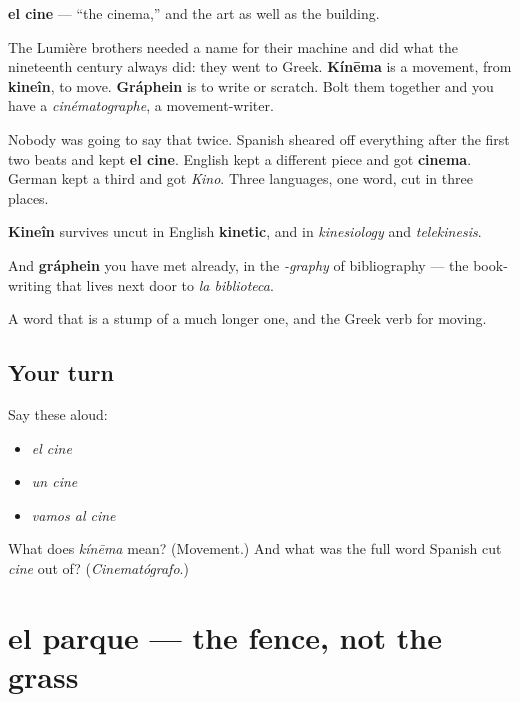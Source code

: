 \begin{cousinweb}
\textbf{el cine} — \textquotedblleft{}the cinema,\textquotedblright{} and the art as well as the building.

The Lumière brothers needed a name for their machine and did what the nineteenth century always did: they went to Greek. \textbf{Kínēma} is a movement, from \textbf{kineîn}, to move. \textbf{Gráphein} is to write or scratch. Bolt them together and you have a \emph{cinématographe}, a movement-writer.

Nobody was going to say that twice. Spanish sheared off everything after the first two beats and kept \textbf{el cine}. English kept a different piece and got \textbf{cinema}. German kept a third and got \emph{Kino}. Three languages, one word, cut in three places.

\textbf{Kineîn} survives uncut in English \textbf{kinetic}, and in \emph{kinesiology} and \emph{telekinesis}.

And \textbf{gráphein} you have met already, in the \emph{-graphy} of bibliography — the book-writing that lives next door to \emph{la biblioteca}.
\end{cousinweb}

\begin{grammarlens}[title={What you've built}]
A word that is a stump of a much longer one, and the Greek verb for moving.
\end{grammarlens}

\subsection*{Your turn}
Say these aloud:

\begin{itemize}
\raggedright
  \item \emph{el cine}
  \item \emph{un cine}
  \item \emph{vamos al cine}
\end{itemize}

\begin{tcolorbox}[breakable,colback=teal!4,colframe=teal!35!black,title={Before you move on}]
What does \emph{kínēma} mean? (Movement.) And what was the full word Spanish cut \emph{cine} out of? (\emph{Cinematógrafo}.)
\end{tcolorbox}
\section[el parque]{el parque — the fence, not the grass}

